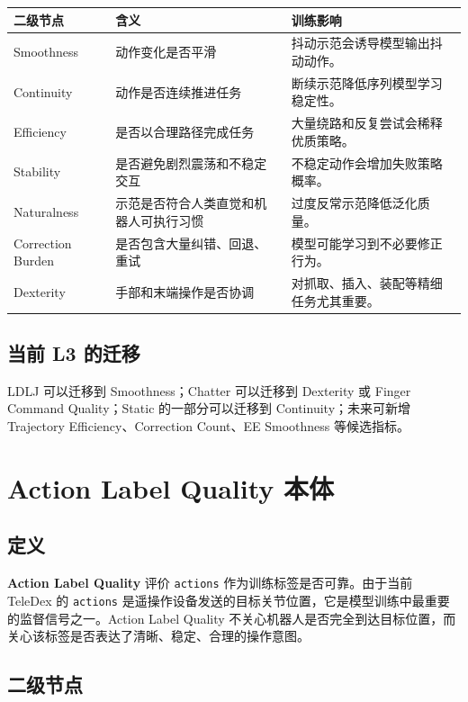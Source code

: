 \documentclass[UTF8,zihao=-4]{ctexart}
\newcommand{\Code}[1]{\texttt{#1}}
\newcommand{\Term}[1]{\textbf{#1}}
\begin{document}
\begin{longtable}{L{3.1cm} L{4.7cm} L{5.8cm}}
\toprule
二级节点 & 含义 & 训练影响 \\
\midrule
Smoothness & 动作变化是否平滑 & 抖动示范会诱导模型输出抖动动作。 \\
Continuity & 动作是否连续推进任务 & 断续示范降低序列模型学习稳定性。 \\
Efficiency & 是否以合理路径完成任务 & 大量绕路和反复尝试会稀释优质策略。 \\
Stability & 是否避免剧烈震荡和不稳定交互 & 不稳定动作会增加失败策略概率。 \\
Naturalness & 示范是否符合人类直觉和机器人可执行习惯 & 过度反常示范降低泛化质量。 \\
Correction Burden & 是否包含大量纠错、回退、重试 & 模型可能学习到不必要修正行为。 \\
Dexterity & 手部和末端操作是否协调 & 对抓取、插入、装配等精细任务尤其重要。 \\
\bottomrule
\end{longtable}

\subsection{当前 L3 的迁移}

LDLJ 可以迁移到 Smoothness；Chatter 可以迁移到 Dexterity 或 Finger Command Quality；Static 的一部分可以迁移到 Continuity；未来可新增 Trajectory Efficiency、Correction Count、EE Smoothness 等候选指标。

\section{Action Label Quality 本体}

\subsection{定义}

\Term{Action Label Quality} 评价 \Code{actions} 作为训练标签是否可靠。由于当前 TeleDex 的 \Code{actions} 是遥操作设备发送的目标关节位置，它是模型训练中最重要的监督信号之一。Action Label Quality 不关心机器人是否完全到达目标位置，而关心该标签是否表达了清晰、稳定、合理的操作意图。

\subsection{二级节点}
\end{document}
